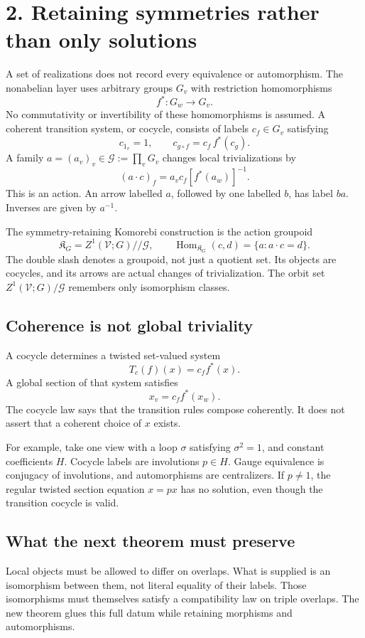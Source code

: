 \documentclass[11pt]{article}
\newcommand{\V}{\mathcal V}
\newcommand{\K}{\mathfrak K}
\newcommand{\G}{\mathcal G}
\begin{document}
\clearpage
\section*{2. Retaining symmetries rather than only solutions}
A set of realizations does not record every equivalence or automorphism. The nonabelian layer uses arbitrary groups $G_v$ with restriction homomorphisms
\[
f^*:G_w\to G_v.
\]
No commutativity or invertibility of these homomorphisms is assumed. A coherent transition system, or cocycle, consists of labels $c_f\in G_v$ satisfying
\[
\boxed{c_{1_v}=1,\qquad c_{g\circ f}=c_f\,f^*(c_g).}
\]
A family $a=(a_v)_v\in\G:=\prod_vG_v$ changes local trivializations by
\[
\boxed{(a\cdot c)_f=a_vc_f[f^*(a_w)]^{-1}.}
\]
This is an action. An arrow labelled $a$, followed by one labelled $b$, has label $ba$. Inverses are given by $a^{-1}$.

The symmetry-retaining Komorebi construction is the action groupoid
\[
\K_G=Z^1(\V;G)//\G,
\qquad
\operatorname{Hom}_{\K_G}(c,d)=\{a:a\cdot c=d\}.
\]
The double slash denotes a groupoid, not just a quotient set. Its objects are cocycles, and its arrows are actual changes of trivialization. The orbit set $Z^1(\V;G)/\G$ remembers only isomorphism classes.

\subsection*{Coherence is not global triviality}
A cocycle determines a twisted set-valued system
\[
T_c(f)(x)=c_f f^*(x).
\]
A global section of that system satisfies
\[
x_v=c_f f^*(x_w).
\]
The cocycle law says that the transition rules compose coherently. It does not assert that a coherent choice of $x$ exists.

For example, take one view with a loop $\sigma$ satisfying $\sigma^2=1$, and constant coefficients $H$. Cocycle labels are involutions $p\in H$. Gauge equivalence is conjugacy of involutions, and automorphisms are centralizers. If $p\ne1$, the regular twisted section equation $x=px$ has no solution, even though the transition cocycle is valid.

\subsection*{What the next theorem must preserve}
Local objects must be allowed to differ on overlaps. What is supplied is an isomorphism between them, not literal equality of their labels. Those isomorphisms must themselves satisfy a compatibility law on triple overlaps. The new theorem glues this full datum while retaining morphisms and automorphisms.
\end{document}

